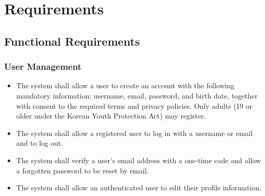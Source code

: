 \documentclass[conference]{IEEEtran}
\begin{document}
\section{Requirements}

\subsection{Functional Requirements}

\subsubsection{User Management}
\begin{itemize}
    \item The system shall allow a user to create an account with the following mandatory information: username, email, password, and birth date, together with consent to the required terms and privacy policies. Only adults (19 or older under the Korean Youth Protection Act) may register.
    \item The system shall allow a registered user to log in with a username or email and to log out.
    \item The system shall verify a user's email address with a one-time code and allow a forgotten password to be reset by email.
    \item The system shall allow an authenticated user to edit their profile information.
\end{itemize}
\end{document}
